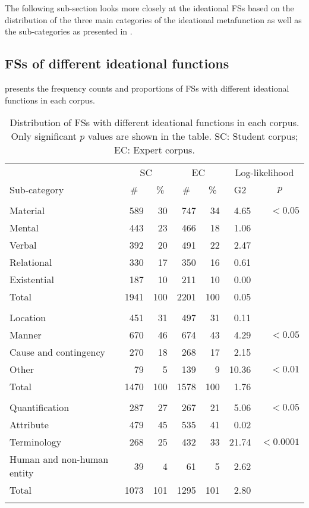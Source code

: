 \documentclass[output=paper]{langscibook}
\begin{document}
The following sub-section looks more closely at the ideational FSs based on the distribution of the three main categories of the ideational metafunction as well as the sub-categories as presented in .

\subsection{FSs of different ideational functions} 

 presents the frequency counts and proportions of FSs with different ideational functions in each corpus.


\begin{table}
\begin{tabular}{>{\raggedright}p{}rrrrrr}
\lsptoprule
               & \multicolumn{2}{c}{SC} & \multicolumn{2}{c}{EC} & \multicolumn{2}{c}{Log-likelihood}\\\cmidrule(lr){2-3}\cmidrule(lr){4-5}\cmidrule(lr){6-7}
Sub-category & \multicolumn{1}{c}{\#} & \multicolumn{1}{c}{\%} & \multicolumn{1}{c}{\#} & \multicolumn{1}{c}{\%} & \multicolumn{1}{c}{G2} & \multicolumn{1}{c}{$p$}\\\midrule
\multicolumn{7}{c}{Process}\\\midrule
Material & 589 & 30 & 747 & 34 & 4.65 & $<0.05$\\
Mental & 443 & 23 & 466 & 18 & 1.06\\
Verbal & 392 & 20 & 491 & 22 & 2.47\\
Relational & 330 & 17 & 350 & 16 & 0.61\\
Existential & 187 & 10 & 211 & 10 & 0.00\\
Total & 1941 & 100 & 2201 & 100 & 0.05\\\midrule
\multicolumn{7}{c}{Circumstance}\\\midrule
Location & 451 & 31 & 497 & 31 & 0.11\\
Manner & 670 & 46 & 674 & 43 & 4.29 & $<0.05$\\
Cause and contingency & 270 & 18 & 268 & 17 & 2.15\\
Other & 79 & 5 & 139 & 9 & 10.36 & $<0.01$\\
Total & 1470 & 100 & 1578 & 100 & 1.76\\\midrule
\multicolumn{7}{c}{Participant}\\\midrule
Quantification & 287 & 27 & 267 & 21 & 5.06 & $<0.05$\\
Attribute & 479 & 45 & 535 & 41 & 0.02\\
Terminology & 268 & 25 & 432 & 33 & 21.74 & $<0.0001$\\
Human and non-human entity & 39 & 4 & 61 & 5 & 2.62\\
Total & 1073 & 101 & 1295 & 101 & 2.80\\
\lspbottomrule
\end{tabular}
\caption{Distribution of FSs with different ideational functions in each corpus. Only significant $p$ values are shown in the table. SC: Student corpus; EC: Expert corpus.\label{tab:wang:4}}
\end{table}
\end{document}
